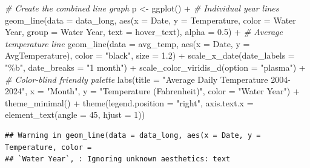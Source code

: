 \documentclass[
]{book}
\newenvironment{Shaded}{\begin{snugshade}}{\end{snugshade}}
\newcommand{\AttributeTok}[1]{\textcolor[rgb]{0.77,0.63,0.00}{#1}}
\newcommand{\CommentTok}[1]{\textcolor[rgb]{0.56,0.35,0.01}{\textit{#1}}}
\newcommand{\DecValTok}[1]{\textcolor[rgb]{0.00,0.00,0.81}{#1}}
\newcommand{\FloatTok}[1]{\textcolor[rgb]{0.00,0.00,0.81}{#1}}
\newcommand{\FunctionTok}[1]{\textcolor[rgb]{0.00,0.00,0.00}{#1}}
\newcommand{\NormalTok}[1]{#1}
\newcommand{\OtherTok}[1]{\textcolor[rgb]{0.56,0.35,0.01}{#1}}
\newcommand{\SpecialCharTok}[1]{\textcolor[rgb]{0.00,0.00,0.00}{#1}}
\newcommand{\StringTok}[1]{\textcolor[rgb]{0.31,0.60,0.02}{#1}}
\theoremstyle{definition}
\theoremstyle{definition}
\theoremstyle{definition}
\theoremstyle{definition}
\theoremstyle{remark}
\begin{document}
\begin{Shaded}
\begin{Highlighting}[]
\CommentTok{\# Create the combined line graph}
\NormalTok{p }\OtherTok{\textless{}{-}} \FunctionTok{ggplot}\NormalTok{() }\SpecialCharTok{+}
  \CommentTok{\# Individual year lines}
  \FunctionTok{geom\_line}\NormalTok{(}\AttributeTok{data =}\NormalTok{ data\_long, }
            \FunctionTok{aes}\NormalTok{(}\AttributeTok{x =}\NormalTok{ Date, }\AttributeTok{y =}\NormalTok{ Temperature, }\AttributeTok{color =} \StringTok{\textasciigrave{}}\AttributeTok{Water Year}\StringTok{\textasciigrave{}}\NormalTok{, }\AttributeTok{group =} \StringTok{\textasciigrave{}}\AttributeTok{Water Year}\StringTok{\textasciigrave{}}\NormalTok{, }\AttributeTok{text =}\NormalTok{ hover\_text), }
            \AttributeTok{alpha =} \FloatTok{0.5}\NormalTok{) }\SpecialCharTok{+}
  \CommentTok{\# Average temperature line}
  \FunctionTok{geom\_line}\NormalTok{(}\AttributeTok{data =}\NormalTok{ avg\_temp, }
            \FunctionTok{aes}\NormalTok{(}\AttributeTok{x =}\NormalTok{ Date, }\AttributeTok{y =}\NormalTok{ AvgTemperature),}
            \AttributeTok{color =} \StringTok{"black"}\NormalTok{, }\AttributeTok{size =} \FloatTok{1.2}\NormalTok{) }\SpecialCharTok{+}
  \FunctionTok{scale\_x\_date}\NormalTok{(}\AttributeTok{date\_labels =} \StringTok{"\%b"}\NormalTok{, }\AttributeTok{date\_breaks =} \StringTok{"1 month"}\NormalTok{) }\SpecialCharTok{+}
  \FunctionTok{scale\_color\_viridis\_d}\NormalTok{(}\AttributeTok{option =} \StringTok{"plasma"}\NormalTok{) }\SpecialCharTok{+}  \CommentTok{\# Color{-}blind friendly palette}
  \FunctionTok{labs}\NormalTok{(}\AttributeTok{title =} \StringTok{"Average Daily Temperature 2004{-}2024"}\NormalTok{,}
       \AttributeTok{x =} \StringTok{"Month"}\NormalTok{,}
       \AttributeTok{y =} \StringTok{"Temperature (Fahrenheit)"}\NormalTok{,}
       \AttributeTok{color =} \StringTok{"Water Year"}\NormalTok{) }\SpecialCharTok{+}
  \FunctionTok{theme\_minimal}\NormalTok{() }\SpecialCharTok{+}
  \FunctionTok{theme}\NormalTok{(}\AttributeTok{legend.position =} \StringTok{"right"}\NormalTok{,}
        \AttributeTok{axis.text.x =} \FunctionTok{element\_text}\NormalTok{(}\AttributeTok{angle =} \DecValTok{45}\NormalTok{, }\AttributeTok{hjust =} \DecValTok{1}\NormalTok{))}
\end{Highlighting}
\end{Shaded}

\begin{verbatim}
## Warning in geom_line(data = data_long, aes(x = Date, y = Temperature, color =
## `Water Year`, : Ignoring unknown aesthetics: text
\end{verbatim}
\end{document}
